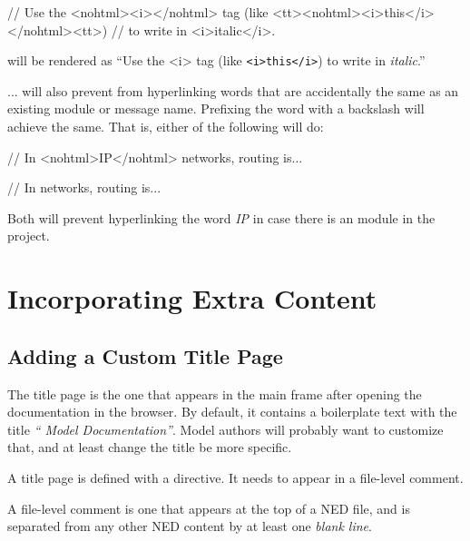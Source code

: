 \begin{ned}
// Use the <nohtml><i></nohtml> tag (like <tt><nohtml><i>this</i></nohtml><tt>)
// to write in <i>italic</i>.
\end{ned}

will be rendered as ``Use the <i> tag (like \texttt{<i>this</i>}) to write
in \textit{italic}.''

... will also prevent 
from hyperlinking words that are accidentally the same as an existing
module or message name. Prefixing the word with a backslash will achieve
the same. That is, either of the following will do:

\begin{ned}
// In <nohtml>IP</nohtml> networks, routing is...
\end{ned}

\begin{ned}
// In \IP networks, routing is...
\end{ned}

Both will prevent hyperlinking the word \textit{IP} in case there is an
 module in the project.



\section{Incorporating Extra Content}
\label{sec:neddoc:incorporating-extra-content}

\subsection{Adding a Custom Title Page}
\label{sec:neddoc:adding-custom-title-page}

The title page is the one that appears in the main frame after opening the
documentation in the browser. By default, it contains a boilerplate text
with the title \textit{``{\opp} Model Documentation''}. Model authors will
probably want to customize that, and at least change the title be more
specific.

A title page is defined with a  directive. It needs to
appear in a file-level comment.

\begin{note}
A file-level comment is one that appears at the top of a NED file, and is
separated from any other NED content by at least one \textit{blank line}.
\end{note}

